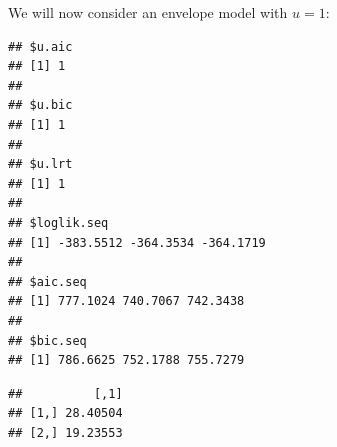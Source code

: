 \documentclass[
  ignorenonframetext,
]{beamer}
\newenvironment{Shaded}{\begin{snugshade}}{\end{snugshade}}
\newcommand{\AttributeTok}[1]{\textcolor[rgb]{0.77,0.63,0.00}{#1}}
\newcommand{\CommentTok}[1]{\textcolor[rgb]{0.56,0.35,0.01}{\textit{#1}}}
\newcommand{\DecValTok}[1]{\textcolor[rgb]{0.00,0.00,0.81}{#1}}
\newcommand{\FunctionTok}[1]{\textcolor[rgb]{0.00,0.00,0.00}{#1}}
\newcommand{\NormalTok}[1]{#1}
\newcommand{\OtherTok}[1]{\textcolor[rgb]{0.56,0.35,0.01}{#1}}
\newcommand{\SpecialCharTok}[1]{\textcolor[rgb]{0.00,0.00,0.00}{#1}}
\begin{document}
\begin{frame}[fragile]{}
\protect\hypertarget{section-1}{}
We will now consider an envelope model with \(\hat{u} = 1\):

\vspace{12pt}
\tiny

\begin{Shaded}
\end{Shaded}

\begin{verbatim}
## $u.aic
## [1] 1
## 
## $u.bic
## [1] 1
## 
## $u.lrt
## [1] 1
## 
## $loglik.seq
## [1] -383.5512 -364.3534 -364.1719
## 
## $aic.seq
## [1] 777.1024 740.7067 742.3438
## 
## $bic.seq
## [1] 786.6625 752.1788 755.7279
\end{verbatim}

\begin{Shaded}
\end{Shaded}

\begin{verbatim}
##          [,1]
## [1,] 28.40504
## [2,] 19.23553
\end{verbatim}
\end{frame}
\end{document}
